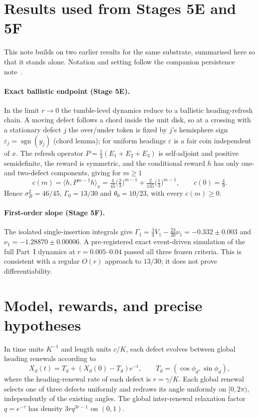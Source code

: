 \documentclass[11pt]{article}
\theoremstyle{remark}\newtheorem{remark}[theorem]{Remark}
\begin{document}
\section*{Results used from Stages 5E and 5F}
This note builds on two earlier results for the same substrate, summarised here so that it stands alone. Notation and setting follow the companion persistence note~\cite{pnote}.

\paragraph{Exact ballistic endpoint (Stage 5E).} In the limit $r\to0$ the tumble-level dynamics reduce to a ballistic heading-refresh chain. A moving defect follows a chord inside the unit disk, so at a crossing with a stationary defect $j$ the over/under token is fixed by $j$'s hemisphere sign $\varepsilon_j=\operatorname{sgn}(y_j)$ (chord lemma); for uniform headings $\varepsilon$ is a fair coin independent of $x$. The refresh operator $P=\tfrac13(E_1+E_2+E_3)$ is self-adjoint and positive semidefinite, the reward is symmetric, and the conditional reward $h$ has only one- and two-defect components, giving for $m\ge1$
\[
c(m)=\langle h,P^{m-1}h\rangle_\pi=\tfrac{4}{45}\bigl(\tfrac23\bigr)^{m-1}+\tfrac{2}{135}\bigl(\tfrac13\bigr)^{m-1},\qquad c(0)=\tfrac49 .
\]
Hence $\sigma_R^2=46/45$, $\Gamma_0=13/30$ and $\theta_0=10/23$, with every $c(m)\ge0$.

\paragraph{First-order slope (Stage 5F).} The isolated single-insertion integrals give $\Gamma_1=\tfrac34V_1-\tfrac{23}{20}\nu_1=-0.332\pm0.003$ and $\nu_1=-1.28870\pm0.00006$. A pre-registered exact event-driven simulation of the full Part~I dynamics at $r=0.005$--$0.04$ passed all three frozen criteria. This is consistent with a regular $O(r)$ approach to $13/30$; it does not prove differentiability.

\section{Model, rewards, and precise hypotheses}
In time units $K^{-1}$ and length units $c/K$, each defect evolves between global heading renewals according to
\begin{equation}\label{eq:law}
X_d(t)=T_d+(X_d(0)-T_d)e^{-t},\qquad T_d=(\cos\phi_d,\sin\phi_d),
\end{equation}
where the heading-renewal rate of each defect is $r=\gamma/K$. Each global renewal selects one of three defects uniformly and redraws its angle uniformly on $[0,2\pi)$, independently of the existing angles. The global inter-renewal relaxation factor $q=e^{-\tau}$ has density $3r q^{3r-1}$ on $(0,1)$.
\end{document}
